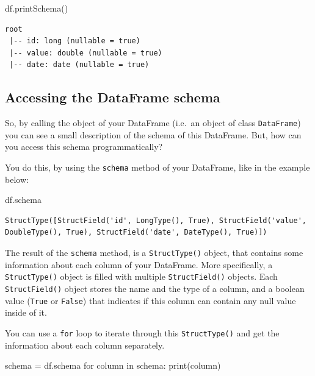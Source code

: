 \documentclass[
  11pt,
  letterpaper,
  DIV=11,
  numbers=noendperiod]{scrreprt}
\newenvironment{Shaded}{\begin{snugshade}}{\end{snugshade}}
\newcommand{\BuiltInTok}[1]{\textcolor[rgb]{0.00,0.23,0.31}{#1}}
\newcommand{\ControlFlowTok}[1]{\textcolor[rgb]{0.00,0.23,0.31}{#1}}
\newcommand{\KeywordTok}[1]{\textcolor[rgb]{0.00,0.23,0.31}{#1}}
\newcommand{\NormalTok}[1]{\textcolor[rgb]{0.00,0.23,0.31}{#1}}
\newcommand{\OperatorTok}[1]{\textcolor[rgb]{0.37,0.37,0.37}{#1}}
\begin{document}
\begin{Shaded}
\begin{Highlighting}[]
\NormalTok{df.printSchema()}
\end{Highlighting}
\end{Shaded}

\begin{verbatim}
root
 |-- id: long (nullable = true)
 |-- value: double (nullable = true)
 |-- date: date (nullable = true)
\end{verbatim}

\hypertarget{accessing-the-dataframe-schema}{%
\subsection{Accessing the DataFrame
schema}\label{accessing-the-dataframe-schema}}

So, by calling the object of your DataFrame (i.e.~an object of class
\texttt{DataFrame}) you can see a small description of the schema of
this DataFrame. But, how can you access this schema programmatically?

You do this, by using the \texttt{schema} method of your DataFrame, like
in the example below:

\begin{Shaded}
\begin{Highlighting}[]
\NormalTok{df.schema}
\end{Highlighting}
\end{Shaded}

\begin{verbatim}
StructType([StructField('id', LongType(), True), StructField('value', DoubleType(), True), StructField('date', DateType(), True)])
\end{verbatim}

The result of the \texttt{schema} method, is a \texttt{StructType()}
object, that contains some information about each column of your
DataFrame. More specifically, a \texttt{StructType()} object is filled
with multiple \texttt{StructField()} objects. Each
\texttt{StructField()} object stores the name and the type of a column,
and a boolean value (\texttt{True} or \texttt{False}) that indicates if
this column can contain any null value inside of it.

You can use a \texttt{for} loop to iterate through this
\texttt{StructType()} and get the information about each column
separately.

\begin{Shaded}
\begin{Highlighting}[]
\NormalTok{schema }\OperatorTok{=}\NormalTok{ df.schema}
\ControlFlowTok{for}\NormalTok{ column }\KeywordTok{in}\NormalTok{ schema:}
  \BuiltInTok{print}\NormalTok{(column)}
\end{Highlighting}
\end{Shaded}
\end{document}
